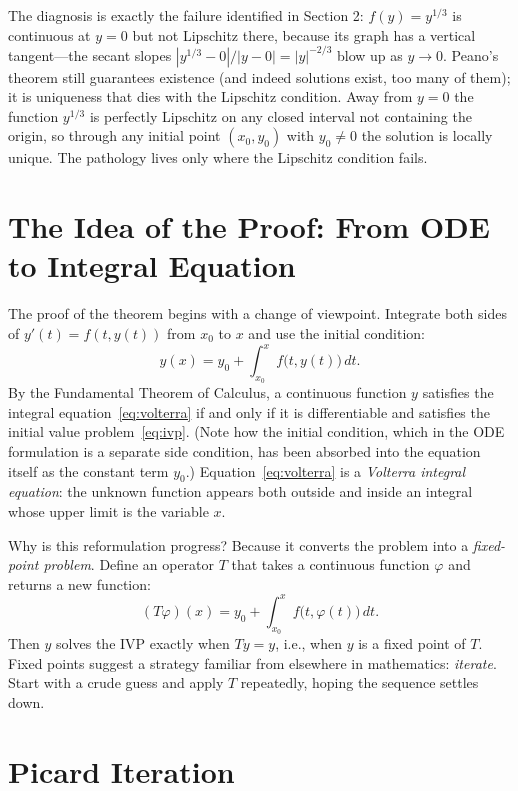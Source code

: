 \documentclass{essay}
\begin{document}
The diagnosis is exactly the failure identified in Section 2: \(f(y) = y^{1/3}\) is continuous at \(y = 0\) but not Lipschitz there, because its graph has a vertical tangent---the secant slopes \(|y^{1/3} - 0|/|y - 0| = |y|^{-2/3}\) blow up as \(y \to 0\). Peano's theorem still guarantees existence (and indeed solutions exist, too many of them); it is uniqueness that dies with the Lipschitz condition. Away from \(y = 0\) the function \(y^{1/3}\) is perfectly Lipschitz on any closed interval not containing the origin, so through any initial point \((x_{0}, y_{0})\) with \(y_{0} \neq 0\) the solution is locally unique. The pathology lives only where the Lipschitz condition fails.

\section{The Idea of the Proof: From ODE to Integral Equation}

The proof of the theorem begins with a change of viewpoint. Integrate both sides of \(y'(t) = f(t, y(t))\) from \(x_{0}\) to \(x\) and use the initial condition:
\begin{equation}
  y(x) = y_{0} + \int_{x_{0}}^{x} f\bigl(t, y(t)\bigr)\, dt.
  \label{eq:volterra}
\end{equation}
By the Fundamental Theorem of Calculus, a continuous function \(y\) satisfies the integral equation~\eqref{eq:volterra} if and only if it is differentiable and satisfies the initial value problem~\eqref{eq:ivp}. (Note how the initial condition, which in the ODE formulation is a separate side condition, has been absorbed into the equation itself as the constant term \(y_{0}\).) Equation~\eqref{eq:volterra} is a \emph{Volterra integral equation}: the unknown function appears both outside and inside an integral whose upper limit is the variable \(x\).

Why is this reformulation progress? Because it converts the problem into a \emph{fixed-point problem}. Define an operator \(T\) that takes a continuous function \(\varphi\) and returns a new function:
\[ (T\varphi)(x) = y_{0} + \int_{x_{0}}^{x} f\bigl(t, \varphi(t)\bigr)\, dt. \]
Then \(y\) solves the IVP exactly when \(T y = y\), i.e., when \(y\) is a fixed point of \(T\). Fixed points suggest a strategy familiar from elsewhere in mathematics: \emph{iterate}. Start with a crude guess and apply \(T\) repeatedly, hoping the sequence settles down.

\section{Picard Iteration}
\end{document}
